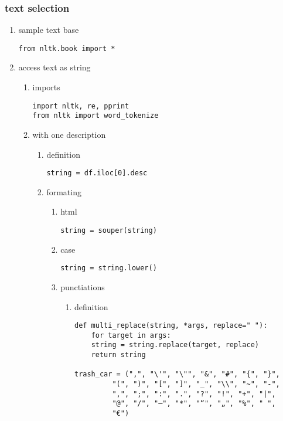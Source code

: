 \documentclass[11pt]{article}
\begin{document}
\subsubsection{text selection}
\label{sec:org47540c3}
\begin{enumerate}
\item sample text base
\label{sec:org20e381b}
\begin{verbatim}
from nltk.book import *
\end{verbatim}
\item access text as string
\label{sec:orgecabd35}
\begin{enumerate}
\item imports
\label{sec:orga98fb27}
\begin{verbatim}
import nltk, re, pprint
from nltk import word_tokenize
\end{verbatim}
\item with one description
\label{sec:orgc97554d}
\begin{enumerate}
\item definition
\label{sec:orgc267e96}
\begin{verbatim}
string = df.iloc[0].desc
\end{verbatim}

\item formating
\label{sec:org56300d8}
\begin{enumerate}
\item html
\label{sec:org8acab07}
\begin{verbatim}
string = souper(string)
\end{verbatim}

\item case
\label{sec:org8825d46}
\begin{verbatim}
string = string.lower()
\end{verbatim}

\item punctiations
\label{sec:org6dc4ba2}

\begin{enumerate}
\item definition
\label{sec:org799a504}
\begin{verbatim}
def multi_replace(string, *args, replace=" "):
    for target in args:
	string = string.replace(target, replace)
    return string

trash_car = (",", "\'", "\"", "&", "#", "{", "}",
	     "(", ")", "[", "]", "_", "\\", "~", "-",
	     ",", ";", ":", ".", "?", "!", "+", "|",
	     "@", "/", "–", "*", "“", "„", "%", " ",
	     "€")


\end{verbatim}
\end{enumerate}
\end{enumerate}
\end{enumerate}
\end{enumerate}
\end{enumerate}
\end{document}
